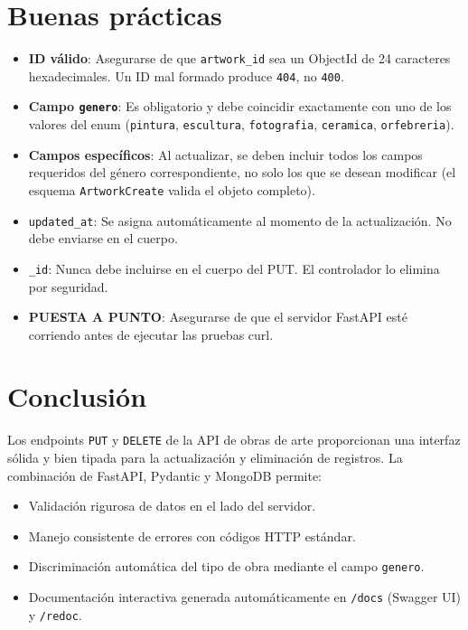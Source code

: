 \documentclass[12pt,a4paper]{article}
\begin{document}
\section{Buenas prácticas}

\begin{itemize}
    \item \textbf{ID válido}: Asegurarse de que \texttt{artwork\_id} sea un
          ObjectId de 24 caracteres hexadecimales. Un ID mal formado produce
          \texttt{404}, no \texttt{400}.
    \item \textbf{Campo \texttt{genero}}: Es obligatorio y debe coincidir
          exactamente con uno de los valores del enum (\texttt{pintura},
          \texttt{escultura}, \texttt{fotografia}, \texttt{ceramica},
          \texttt{orfebreria}).
    \item \textbf{Campos específicos}: Al actualizar, se deben incluir todos
          los campos requeridos del género correspondiente, no solo los que
          se desean modificar (el esquema \texttt{ArtworkCreate} valida el
          objeto completo).
    \item \texttt{updated\_at}: Se asigna automáticamente al momento de la
          actualización. No debe enviarse en el cuerpo.
    \item \texttt{\_id}: Nunca debe incluirse en el cuerpo del PUT. El
          controlador lo elimina por seguridad.
    \item \textbf{PUESTA A PUNTO}: Asegurarse de que el servidor FastAPI
          esté corriendo antes de ejecutar las pruebas curl.
\end{itemize}

\section{Conclusión}

Los endpoints \texttt{PUT} y \texttt{DELETE} de la API de obras de arte
proporcionan una interfaz sólida y bien tipada para la actualización y
eliminación de registros. La combinación de FastAPI, Pydantic y MongoDB
permite:

\begin{itemize}
    \item Validación rigurosa de datos en el lado del servidor.
    \item Manejo consistente de errores con códigos HTTP estándar.
    \item Discriminación automática del tipo de obra mediante el campo
          \texttt{genero}.
    \item Documentación interactiva generada automáticamente en
          \texttt{/docs} (Swagger UI) y \texttt{/redoc}.
\end{itemize}
\end{document}
